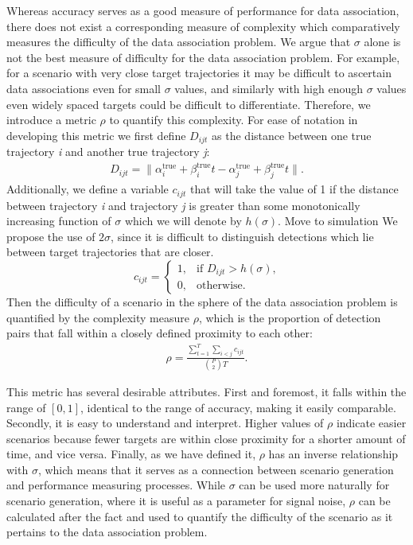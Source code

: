 Whereas accuracy serves as a good measure of performance for data association, there does not exist a corresponding measure of complexity which comparatively measures the difficulty of the data association problem. We argue that $\sigma$ alone is not the best measure of difficulty for the data association problem. For example, for a scenario with very close target trajectories it may be difficult to ascertain data associations even for small $\sigma$ values, and similarly with high enough $\sigma$ values even widely spaced targets could be difficult to differentiate. Therefore, we introduce a metric $\rho$ to quantify this complexity. For ease of notation in developing this metric we first define $D_{ijt}$ as the distance between one true trajectory \textit{i} and another true trajectory \textit{j}:
\begin{align*}
D_{ijt} = \| \alpha^{\text{true}}_{i} + \beta^{\text{true}}_{i}t - \alpha^{\text{true}}_{j} + \beta^{\text{true}}_{j}t \|.
\end{align*}
Additionally, we define a variable $c_{ijt}$ that will take the value of 1 if the distance between trajectory \textit{i} and trajectory \textit{j} is greater than some monotonically increasing function of $\sigma$ which we will denote by $h(\sigma)$. {\color{red} Move to simulation We propose the use of $2\sigma$, since it is difficult to distinguish detections which lie between target trajectories that are closer.}  
\[c_{ijt} = 
\begin{cases}
1, & \text{if $D_{ijt} > h(\sigma)$,}\\
0, & \text{otherwise.}
\end{cases}\]
Then the difficulty of a scenario in the sphere of the data association problem is quantified by the complexity measure $\rho$, which is the proportion of detection pairs that fall within a closely defined proximity to each other:
\begin{align*}
\rho =  \frac{\sum\limits_{t=1}^{T}\sum\limits_{i<j}c_{ijt}}{\binom{P}{2} T}.
\end{align*}

This metric has several desirable attributes. First and foremost, it falls within the range of $[0,1]$, identical to the range of accuracy, making it easily comparable. Secondly, it is easy to understand and interpret. Higher values of $\rho$ indicate easier scenarios because fewer targets are within close proximity for a shorter amount of time, and vice versa. Finally, as we have defined it, $\rho$ has an inverse relationship with $\sigma$, which means that it serves as a connection between scenario generation and performance measuring processes. While $\sigma$ can be used more naturally for scenario generation, where it is useful as a parameter for signal noise, $\rho$ can be calculated after the fact and used to quantify the difficulty of the scenario as it pertains to the data association problem. 

